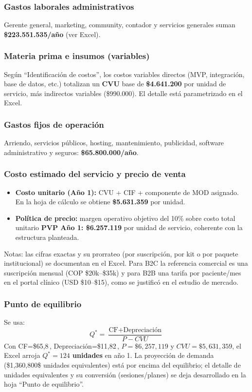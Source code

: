 \subsubsection{Gastos laborales administrativos}
Gerente general, marketing, community, contador y servicios generales suman \textbf{\$223.551.535/año} (ver Excel).

\subsubsection{Materia prima e insumos (variables)}
Según ``Identificación de costos'', los costos variables directos (MVP, integración, base de datos, etc.) totalizan un \textbf{CVU} base de \textbf{\$4.641.200} por unidad de servicio, más indirectos variables (\$990.000). El detalle está parametrizado en el Excel.

\subsubsection{Gastos fijos de operación}
Arriendo, servicios públicos, hosting, mantenimiento, publicidad, software administrativo y seguros: \textbf{\$65.800.000/año}.

\subsubsection{Costo estimado del servicio y precio de venta}
\begin{itemize}
    \item \textbf{Costo unitario (Año 1):} CVU + CIF + componente de MOD asignado. En la hoja de cálculo se obtiene \textbf{\$5.631.359} por unidad.
    \item \textbf{Política de precio:} margen operativo objetivo del 10\% sobre costo total unitario \textrightarrow{} \textbf{PVP Año 1: \$6.257.119} por unidad de servicio, coherente con la estructura planteada.
\end{itemize}
Notas: las cifras exactas y su prorrateo (por suscripción, por kit o por paquete institucional) se documentan en el Excel. Para B2C la referencia comercial es una suscripción mensual (COP \$20k--\$35k) y para B2B una tarifa por paciente/mes en el portal clínico (USD \$10--\$15), como se justificó en el estudio de mercado.

\subsubsection{Punto de equilibrio}
Se usa:
\[
Q^{*} = \frac{\text{CF} + \text{Depreciación}}{P - CVU}
\]
Con CF=\$65{,}8\,, Depreciación=\$11{,}82\,, $P=\$6{,}257{,}119$ y $CVU=\$5{,}631{,}359$, el Excel arroja \textbf{$Q^{*}=124$ unidades} en año 1. La proyección de demanda (\$1{,}360{,}800\$ unidades equivalentes) está por encima del equilibrio; el detalle de unidades equivalentes y su conversión (sesiones/planes) se deja desarrollado en la hoja ``Punto de equilibrio''.

